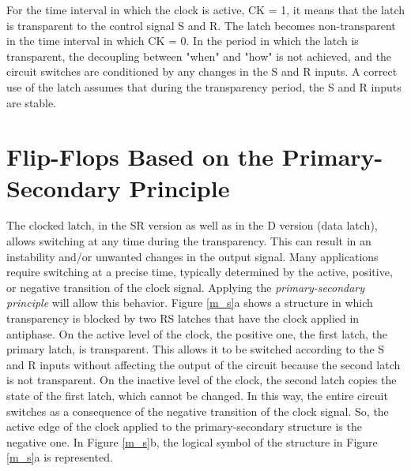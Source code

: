 For the time interval in which the clock is active, CK = 1, it means that the latch is transparent to the control signal S and R. The latch becomes non-transparent in the time interval in which CK = 0. In the period in which the latch is transparent, the decoupling between "when" and "how" is not achieved, and the circuit switches are conditioned by any changes in the S and R inputs. A correct use of the latch assumes that during the transparency period, the S and R inputs are stable.



\section{Flip-Flops Based on the Primary-Secondary Principle}

The clocked latch, in the SR version as well as in the D version (data latch), allows switching at any time during the transparency. This can result in an instability and/or unwanted changes in the output signal. Many applications require switching at a precise time, typically determined by the active, positive, or negative transition of the clock signal. Applying the {\em primary-secondary principle} will allow this behavior.
Figure \ref{m_s}a shows a structure in which transparency is blocked by two RS latches that have the clock applied in antiphase. On the active level of the clock, the positive one, the first latch, the primary latch, is transparent. This allows it to be switched according to the S and R inputs without affecting the output of the circuit because the second latch is not transparent. On the inactive level of the clock, the second latch copies the state of the first latch, which cannot be changed. In this way, the entire circuit switches as a consequence of the negative transition of the clock signal. So, the active edge of the clock applied to the primary-secondary structure is the negative one. In Figure \ref{m_s}b, the logical symbol of the structure in Figure \ref{m_s}a is represented.


